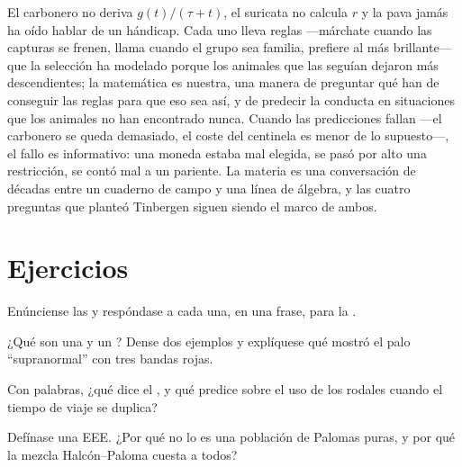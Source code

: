 \begin{remark}\label{rem:b3:behavioural-ecology:remark}
El carbonero no deriva $g(t)/(\tau + t)$, el suricata no calcula $r$ y
la pava jamás ha oído hablar de un hándicap. Cada uno lleva reglas
---márchate cuando las capturas se frenen, llama cuando el grupo sea
familia, prefiere al más brillante--- que la selección ha modelado
porque los animales que las seguían dejaron más descendientes; la
matemática es nuestra, una manera de preguntar qué han de conseguir las
reglas para que eso sea así, y de predecir la conducta en situaciones
que los animales no han encontrado nunca. Cuando las predicciones
fallan ---el carbonero se queda demasiado, el coste del centinela es
menor de lo supuesto---, el fallo es informativo: una moneda estaba mal
elegida, se pasó por alto una restricción, se contó mal a un pariente.
La materia es una conversación de décadas entre un cuaderno de campo y
una línea de álgebra, y las cuatro preguntas que planteó Tinbergen
siguen siendo el marco de ambos.
\end{remark}

\section{Ejercicios}

\begin{exercise}[$\star$]\label{exo:b3:behavioural-ecology:1}
Enúnciense las  y respóndase a cada una,
en una frase, para la .
\end{exercise}

\begin{exercise}[$\star$]\label{exo:b3:behavioural-ecology:2}
¿Qué son una  y un ? Dense dos
ejemplos y explíquese qué mostró el palo ``supranormal'' con tres
bandas rojas.
\end{exercise}

\begin{exercise}[$\star$]\label{exo:b3:behavioural-ecology:3}
Con palabras, ¿qué dice el , y qué predice
sobre el uso de los rodales cuando el tiempo de viaje se duplica?
\end{exercise}

\begin{exercise}[$\star$]\label{exo:b3:behavioural-ecology:4}
Defínase una EEE. ¿Por qué no lo es una población de Palomas puras, y
por qué la mezcla Halcón--Paloma cuesta a todos?
\end{exercise}

